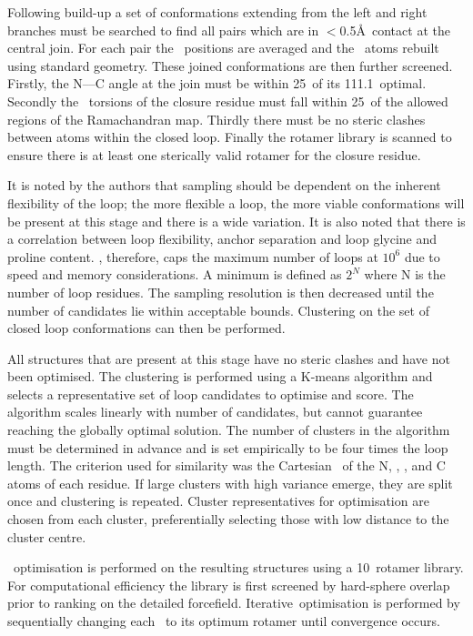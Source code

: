 Following build-up a set of conformations extending from the left and right branches must be searched to find all pairs which are in $<$0.5\AA\ contact at the central join. For each pair the \ca\ positions are averaged and the \sidechain\  atoms rebuilt using standard geometry. These joined conformations are then further screened. Firstly, the  N--\ca--C angle at the join must be within 25\degree\ of its 111.1\degree\ optimal. Secondly the \phipsi\ torsions of the closure residue must fall within 25\degree\ of the allowed regions of the Ramachandran map. Thirdly there must be no steric clashes between atoms within the closed loop. Finally the rotamer library is scanned to ensure there is at least one sterically valid rotamer for the closure residue.

It is noted by the authors that sampling should be dependent on the inherent flexibility of the loop; the more flexible a loop, the more viable conformations will be present at this stage and there is a wide variation. It is also noted that there is a correlation between loop flexibility, anchor separation and loop glycine and proline content. \plop, therefore, caps the maximum number of loops at $10^6$ due to speed and memory considerations. A minimum is defined as $2^N$ where N is the number of loop residues. The sampling resolution is then decreased until the number of candidates lie within acceptable bounds. Clustering on the set of closed loop conformations can then be performed.

All structures that are present at this stage have no steric clashes and have not been optimised. The clustering is performed using a K-means algorithm\cite{COMPCHEM:KMeans} and selects a representative set of loop candidates to optimise and score. The algorithm scales linearly with number of candidates, but cannot guarantee reaching the globally optimal solution. The number of clusters in the algorithm must be determined in advance and is set empirically to be four times the loop length. The criterion used for similarity was the Cartesian \crms\ of the N, \ca, \cb, and C atoms of each residue. If large clusters with high variance emerge, they are split once and clustering is repeated. Cluster representatives for optimisation are chosen from each cluster, preferentially selecting those with low distance to the cluster centre. 

\Sidechain\ optimisation\cite{METHOD:Plop:Jacobson2002A} is performed on the resulting structures using a 10\degree\ rotamer library. For computational efficiency the library is first screened by hard-sphere overlap prior to ranking on the detailed forcefield. Iterative\ optimisation is performed by sequentially changing each \sidechain\ to its optimum rotamer until convergence occurs. 

